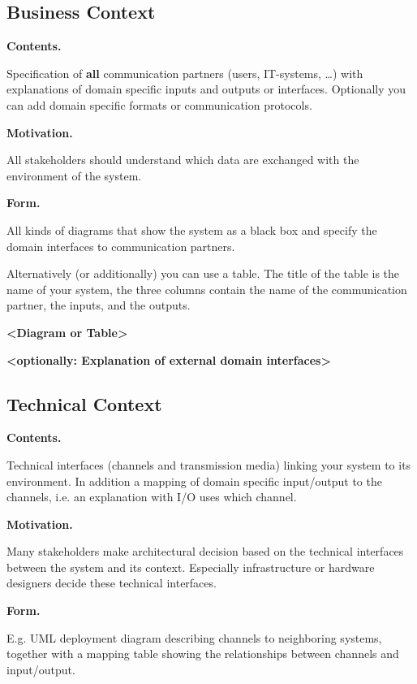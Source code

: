 \documentclass[]{article}
\begin{document}
\hypertarget{_business_context}{%
\subsection{Business Context}\label{_business_context}}

\textbf{Contents.}

Specification of \textbf{all} communication partners (users, IT-systems,
\ldots{}) with explanations of domain specific inputs and outputs or
interfaces. Optionally you can add domain specific formats or
communication protocols.

\textbf{Motivation.}

All stakeholders should understand which data are exchanged with the
environment of the system.

\textbf{Form.}

All kinds of diagrams that show the system as a black box and specify
the domain interfaces to communication partners.

Alternatively (or additionally) you can use a table. The title of the
table is the name of your system, the three columns contain the name of
the communication partner, the inputs, and the outputs.

\textbf{\textless{}Diagram or Table\textgreater{}}

\textbf{\textless{}optionally: Explanation of external domain
interfaces\textgreater{}}

\hypertarget{_technical_context}{%
\subsection{Technical Context}\label{_technical_context}}

\textbf{Contents.}

Technical interfaces (channels and transmission media) linking your
system to its environment. In addition a mapping of domain specific
input/output to the channels, i.e. an explanation with I/O uses which
channel.

\textbf{Motivation.}

Many stakeholders make architectural decision based on the technical
interfaces between the system and its context. Especially infrastructure
or hardware designers decide these technical interfaces.

\textbf{Form.}

E.g. UML deployment diagram describing channels to neighboring systems,
together with a mapping table showing the relationships between channels
and input/output.
\end{document}

